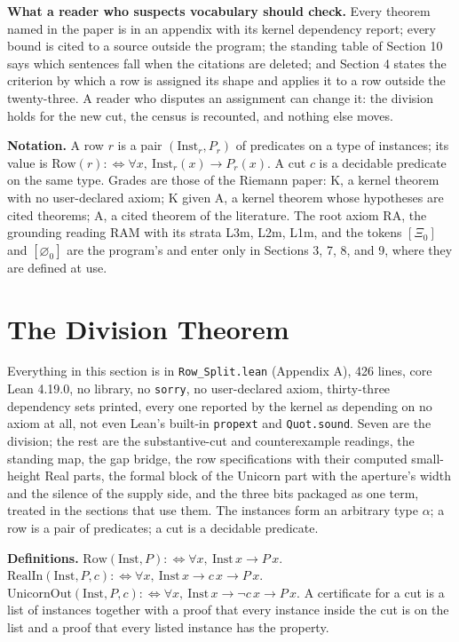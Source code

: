 \documentclass[10pt]{article}
\begin{document}
\textbf{What a reader who suspects vocabulary should check.} Every
theorem named in the paper is in an appendix with its kernel dependency
report; every bound is cited to a source outside the program; the
standing table of Section 10 says which sentences fall when the
citations are deleted; and Section 4 states the criterion by which a row
is assigned its shape and applies it to a row outside the twenty-three.
A reader who disputes an assignment can change it: the division holds
for the new cut, the census is recounted, and nothing else moves.

\textbf{Notation.} A row \(r\) is a pair \((\mathrm{Inst}_r, P_r)\) of
predicates on a type of instances; its value is
\(\mathrm{Row}(r) :\Leftrightarrow \forall x,\ \mathrm{Inst}_r(x) \to P_r(x)\).
A cut \(c\) is a decidable predicate on the same type. Grades are those
of the Riemann paper: K, a kernel theorem with no user-declared axiom; K
given A, a kernel theorem whose hypotheses are cited theorems; A, a
cited theorem of the literature. The root axiom \(\mathrm{RA}\), the
grounding reading RAM with its strata L3m, L2m, L1m, and the tokens
\([\Xi_0]\) and \([\varnothing_0]\) are the program's and enter only in
Sections 3, 7, 8, and 9, where they are defined at use.

\hypertarget{the-division-theorem}{%
\section{The Division Theorem}\label{the-division-theorem}}

Everything in this section is in \texttt{Row\_Split.lean} (Appendix A),
426 lines, core Lean 4.19.0, no library, no \texttt{sorry}, no
user-declared axiom, thirty-three dependency sets printed, every one
reported by the kernel as depending on no axiom at all, not even Lean's
built-in \texttt{propext} and \texttt{Quot.sound}. Seven are the
division; the rest are the substantive-cut and counterexample readings,
the standing map, the gap bridge, the row specifications with their
computed small-height Real parts, the formal block of the Unicorn part
with the aperture's width and the silence of the supply side, and the
three bits packaged as one term, treated in the sections that use them.
The instances form an arbitrary type \(\alpha\); a row is a pair of
predicates; a cut is a decidable predicate.

\textbf{Definitions.}
\(\mathrm{Row}(\mathrm{Inst}, P) :\Leftrightarrow \forall x,\ \mathrm{Inst}\,x \to P\,x\).
\(\mathrm{RealIn}(\mathrm{Inst}, P, c) :\Leftrightarrow \forall x,\ \mathrm{Inst}\,x \to c\,x \to P\,x\).
\(\mathrm{UnicornOut}(\mathrm{Inst}, P, c) :\Leftrightarrow \forall x,\ \mathrm{Inst}\,x \to \neg c\,x \to P\,x\).
A certificate for a cut is a list of instances together with a proof
that every instance inside the cut is on the list and a proof that every
listed instance has the property.
\end{document}

